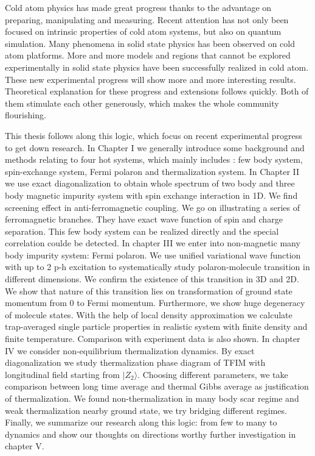 Cold atom physics has made great progress thanks to the advantage on preparing, manipulating and measuring. Recent attention has not only been focused on intrinsic properties of cold atom systems, but also on quantum simulation. Many phenomena in solid state physics has been observed on cold atom platforms. More and more models and regions that cannot be explored experimentally in solid state physics have been successfully realized in cold atom. These new experimental progress will show more and more interesting results. Theoretical explanation for these progress and extensions follows quickly. Both of them stimulate each other generously, which makes the whole community flourishing.

This thesis follows along this logic, which focus on recent experimental progress to get down research. In Chapter I we generally introduce some background and methods relating to four hot systems, which mainly includes : few body system, spin-exchange system, Fermi polaron and thermalization system. In Chapter II we use exact diagonalization to obtain whole spectrum of two body and three body magnetic impurity system with spin exchange interaction in 1D. We find screening effect in anti-ferromagnetic coupling. We go on illustrating a series of ferromagnetic branches. They have exact wave function of spin and charge separation. This few body system can be realized directly and the special correlation coulde be detected. In chapter III we enter into non-magnetic many body impurity system: Fermi polaron. We use unified variational wave function with up to 2 p-h excitation to systematically study polaron-molecule transition in different dimensions. We confirm the existence of this transition in 3D and 2D. We show that nature of this transition lies on transformation of ground state momentum from 0 to Fermi momentum. Furthermore, we show huge degeneracy of molecule states. With the help of local density approximation we calculate trap-averaged single particle properties in realistic system with finite density and finite temperature. Comparison with experiment data is also shown. In chapter IV we consider non-equilibrium thermalization dynamics. By exact diagonalization we study thermalization phase diagram of TFIM with longitudinal field starting from $|Z_2\rangle$. Choosing different parameters, we take comparison between long time average and thermal Gibbs average as justification of thermalization. We found non-thermalization in many body scar regime and weak thermalization nearby ground state, we try bridging different regimes. Finally, we summarize our research along this logic: from few to many to dynamics and show our thoughts on directions worthy further investigation in chapter V.

